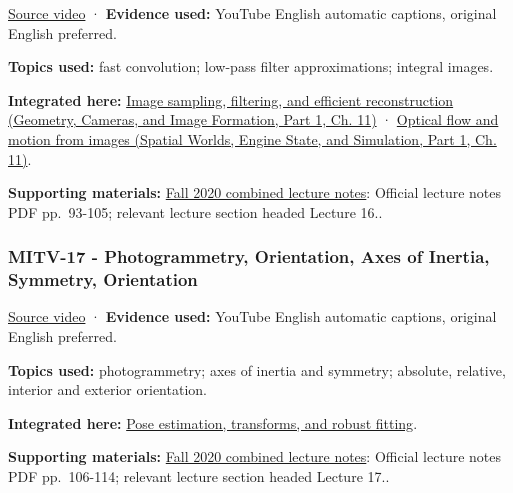 \hypertarget{04-visual-computing-ii-ch036-mitv-16---fast-convolution-low-pass-filter-approximations-integral-images-us-6457032}{}

\href{https://www.youtube.com/watch?v=tblzZhYZtvU}{Source video} · \textbf{Evidence used:} YouTube English automatic captions, original English preferred.

\textbf{Topics used:} fast convolution; low-pass filter approximations; integral images.

\textbf{Integrated here:} \href{../03-Geometry-Cameras-and-Image-Formation-P01/main.pdf\#03-visual-computing-i-ch004-image-sampling-filtering-and-efficient-reconstruction}{Image sampling, filtering, and efficient reconstruction (Geometry, Cameras, and Image Formation, Part 1, Ch. 11)} · \href{../05-Spatial-Worlds-Engine-State-and-Simulation-P01/main.pdf\#04-visual-computing-ii-ch030-optical-flow-and-motion-from-images}{Optical flow and motion from images (Spatial Worlds, Engine State, and Simulation, Part 1, Ch. 11)}.

\textbf{Supporting materials:} \href{https://ocw.mit.edu/courses/6-801-machine-vision-fall-2020/9ec44f69e72995c370b3797818ba01e6_MIT6_801F20_lectureNotes.pdf}{Fall 2020 combined lecture notes}: Official lecture notes PDF pp.~93-105; relevant lecture section headed Lecture 16..

\subsubsection{MITV-17 - Photogrammetry, Orientation, Axes of Inertia, Symmetry, Orientation}\label{04-visual-computing-ii-ch036-mitv-17---photogrammetry-orientation-axes-of-inertia-symmetry-orientation}

\hypertarget{04-visual-computing-ii-ch036-mitv-17---photogrammetry-orientation-axes-of-inertia-symmetry-orientation}{}

\href{https://www.youtube.com/watch?v=R8O0vlHBeNc}{Source video} · \textbf{Evidence used:} YouTube English automatic captions, original English preferred.

\textbf{Topics used:} photogrammetry; axes of inertia and symmetry; absolute, relative, interior and exterior orientation.

\textbf{Integrated here:} \hyperref[04-visual-computing-ii-ch032-pose-estimation-transforms-and-robust-fitting]{Pose estimation, transforms, and robust fitting}.

\textbf{Supporting materials:} \href{https://ocw.mit.edu/courses/6-801-machine-vision-fall-2020/9ec44f69e72995c370b3797818ba01e6_MIT6_801F20_lectureNotes.pdf}{Fall 2020 combined lecture notes}: Official lecture notes PDF pp.~106-114; relevant lecture section headed Lecture 17..

